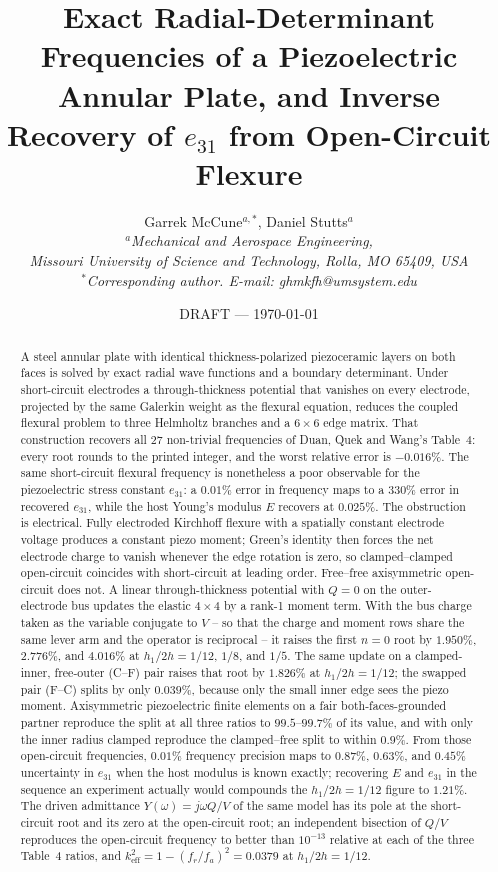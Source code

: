 \documentclass[11pt]{article}
\title{\bfseries Exact Radial-Determinant Frequencies of a Piezoelectric
Annular Plate, and Inverse Recovery of $e_{31}$ from Open-Circuit Flexure}
\author{Garrek McCune$^{a,*}$, Daniel Stutts$^{a}$\\
\small\itshape $^a$Mechanical and Aerospace Engineering,\\
Missouri University of Science and Technology, Rolla, MO 65409, USA\\
\small\upshape $^*$Corresponding author. E-mail: ghmkfh@umsystem.edu}
\date{DRAFT --- \today}
\begin{document}
\maketitle

\begin{abstract}
A steel annular plate with identical thickness-polarized piezoceramic
layers on both faces is solved by exact radial wave functions and a
boundary determinant. Under short-circuit electrodes a
through-thickness potential that vanishes on every electrode, projected
by the same Galerkin weight as the flexural equation, reduces the
coupled flexural problem to three Helmholtz branches and a $6\times6$
edge matrix. That construction recovers all 27 non-trivial frequencies
of Duan, Quek and Wang's Table~4: every root rounds to the printed
integer, and the worst relative error is $-0.016\%$. The same
short-circuit flexural frequency is nonetheless a poor observable for
the piezoelectric stress constant $e_{31}$: a $0.01\%$ error in frequency
maps to a $330\%$ error in recovered $e_{31}$, while the host Young's
modulus $E$ recovers at $0.025\%$. The obstruction is electrical. Fully
electroded Kirchhoff flexure with a spatially constant electrode voltage
produces a constant piezo moment; Green's identity then forces the net
electrode charge to vanish whenever the edge rotation is zero, so
clamped--clamped open-circuit coincides with short-circuit at leading
order. Free--free axisymmetric open-circuit does not. A linear
through-thickness potential with $Q=0$ on the outer-electrode bus
updates the elastic $4\times4$ by a rank-1 moment term. With the bus
charge taken as the variable conjugate to $V$ -- so that the charge and
moment rows share the same lever arm and the operator is reciprocal --
it raises the first $n=0$ root by $1.950\%$, $2.776\%$, and $4.016\%$
at $h_1/2h=1/12$, $1/8$, and $1/5$. The same update on a clamped-inner,
free-outer (C--F) pair raises that root by $1.826\%$ at $h_1/2h=1/12$;
the swapped pair (F--C) splits by only $0.039\%$, because only the
small inner edge sees the piezo moment. Axisymmetric piezoelectric finite
elements on a fair both-faces-grounded partner reproduce the split at
all three ratios to $99.5$--$99.7\%$ of its value, and with only the inner
radius clamped reproduce the clamped--free split to within $0.9\%$. From
those open-circuit frequencies, $0.01\%$ frequency precision maps to
$0.87\%$, $0.63\%$, and $0.45\%$ uncertainty in $e_{31}$ when the host
modulus is known exactly; recovering $E$ and $e_{31}$ in the sequence
an experiment actually would compounds the $h_1/2h=1/12$ figure to
$1.21\%$. The driven admittance $Y(\omega)=j\omega Q/V$ of the same
model has its pole at the short-circuit root and its zero at the
open-circuit root; an independent bisection of $Q/V$ reproduces the
open-circuit frequency to better than $10^{-13}$ relative at each
of the three Table~4 ratios, and
$k_{\mathrm{eff}}^2=1-(f_r/f_a)^2=0.0379$ at $h_1/2h=1/12$.
\end{abstract}
\end{document}
